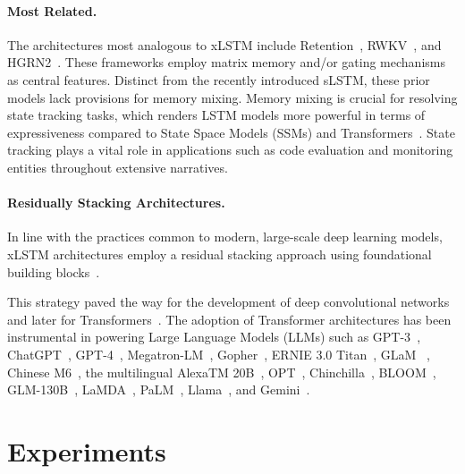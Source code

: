 \paragraph{Most Related.} The architectures most analogous to xLSTM include Retention~\citep{Sun:23arxiv}, RWKV~\citep{Peng:23arxivshort,Peng:24arxivshort}, and HGRN2~\citep{Qin:24arxiv}. These frameworks employ matrix memory and/or gating mechanisms as central features. Distinct from the recently introduced sLSTM, these prior models lack provisions for memory mixing. Memory mixing is crucial for resolving state tracking tasks, which renders LSTM models more powerful in terms of expressiveness compared to State Space Models (SSMs) and Transformers~\citep{Merrill:24,Deletang:23}. State tracking plays a vital role in applications such as code evaluation and monitoring entities throughout extensive narratives.

\paragraph{Residually Stacking Architectures.} In line with the practices common to modern, large-scale deep learning models, xLSTM architectures employ a residual stacking approach using foundational building blocks~\citep{Srivastava:15,He:16}.

This strategy paved the way for the development of deep convolutional networks~\citep{He:16} and later for Transformers~\citep{Vaswani:17}. The adoption of Transformer architectures has been instrumental in powering Large Language Models (LLMs) such as GPT-3~\citep{Brown:20short}, ChatGPT~\citep{Schulman:22short}, GPT-4~\citep{Achiam:23gpt4short}, Megatron-LM~\citep{Shoeybi:19}, Gopher~\citep{Rae:21short}, ERNIE 3.0 Titan~\citep{Wang:21arxivshort}, GLaM ~\citep{Du:21glamshort}, Chinese M6~\citep{Lin:21}, the multilingual AlexaTM 20B~\citep{Soltan:22}, OPT~\citep{Zhang:22opt}, Chinchilla~\citep{Hoffmann:22short}, BLOOM~\citep{Scao:22arxivshort}, GLM-130B~\citep{Zeng:22arxivshort}, LaMDA~\citep{Thoppilan:22short}, PaLM~\citep{Chowdhery:22short}, Llama~\citep{Touvron:23arxiv}, and Gemini~\citep{GeminiTeam:23arxiv,Reid:24arxiv}.

\section{Experiments}
\label{sec:Exp}

